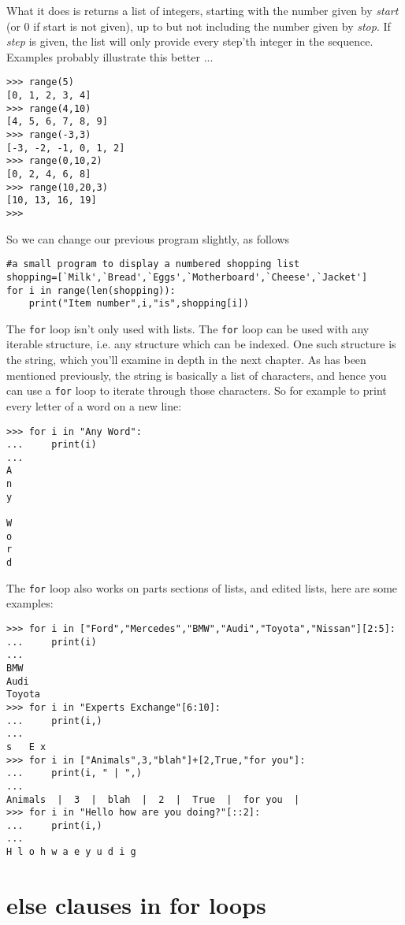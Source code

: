 What it does is returns a list of integers, starting with the number   given by \textit{start} (or 0 if start is not given), up to but not including   the number given by \textit{stop}. If \textit{step} is given, the list will only   provide every step'th integer in the sequence. Examples probably   illustrate this better ...
\begin{lstlisting}
>>> range(5)
[0, 1, 2, 3, 4]
>>> range(4,10)
[4, 5, 6, 7, 8, 9]
>>> range(-3,3)
[-3, -2, -1, 0, 1, 2]
>>> range(0,10,2)
[0, 2, 4, 6, 8]
>>> range(10,20,3)
[10, 13, 16, 19]
>>>
\end{lstlisting}

So we can change our previous program slightly, as follows
\begin{lstlisting}
#a small program to display a numbered shopping list
shopping=[`Milk',`Bread',`Eggs',`Motherboard',`Cheese',`Jacket']
for i in range(len(shopping)):
    print("Item number",i,"is",shopping[i])
\end{lstlisting}

The \texttt{for} loop isn't only used with lists. The \texttt{for} loop can be used with any iterable structure, i.e. any structure which can be indexed. One such structure is the string, which you'll examine in depth in the next chapter. As has been mentioned previously, the string is basically a list of characters, and hence you can use a \texttt{for} loop to iterate through those characters. So for example to print every letter of a word on a new line:   
\begin{lstlisting}
>>> for i in "Any Word":
...     print(i)
... 
A
n
y
 
W
o
r
d
\end{lstlisting}

 The \texttt{for} loop also works on parts sections of lists, and edited lists, here are some examples:
\begin{lstlisting}
>>> for i in ["Ford","Mercedes","BMW","Audi","Toyota","Nissan"][2:5]:
...     print(i)
... 
BMW
Audi
Toyota
>>> for i in "Experts Exchange"[6:10]:
...     print(i,)
... 
s   E x
>>> for i in ["Animals",3,"blah"]+[2,True,"for you"]:
...     print(i, " | ",)
... 
Animals  |  3  |  blah  |  2  |  True  |  for you  | 
>>> for i in "Hello how are you doing?"[::2]:
...     print(i,)
... 
H l o h w a e y u d i g
\end{lstlisting}

\section{else clauses in for loops}

